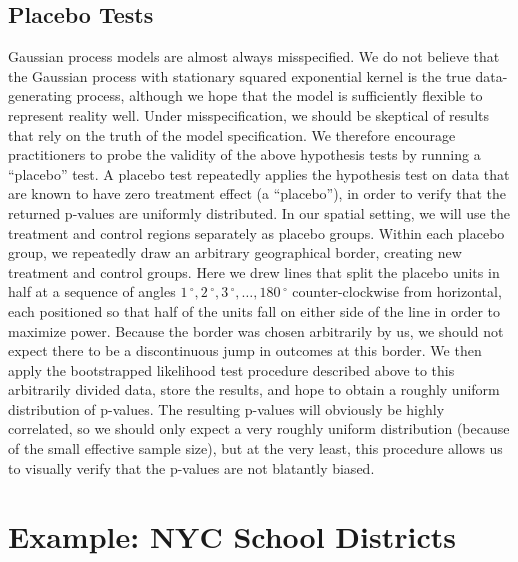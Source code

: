 \documentclass[letter]{article}
\newcommand{\degree}{{\,^\circ}}
\begin{document}
    	\subsection{Placebo Tests}\label{placebo-tests}
    

\label{sec:placebo}
    	Gaussian process models are almost always misspecified.
We do not believe that the Gaussian process with stationary squared exponential kernel is the true data-generating process, although we hope that the model is sufficiently flexible to represent reality well.
Under misspecification, we should be skeptical of results that rely on the truth of the model specification.
We therefore encourage practitioners to probe the validity of the above hypothesis tests by running a ``placebo'' test.
A placebo test repeatedly applies the hypothesis test on data that are known to have zero treatment effect (a ``placebo''),
in order to verify that the returned p-values are uniformly distributed.
In our spatial setting, we will use the treatment and control regions separately as placebo groups.
Within each placebo group, we repeatedly draw an arbitrary geographical border, creating new treatment and control groups.
Here we drew lines that split the placebo units in half at a sequence of angles \(1\degree,2\degree,3\degree,\dotsc,180\degree\) counter-clockwise from horizontal, each positioned so that half of the units fall on either side of the line in order to maximize power.
Because the border was chosen arbitrarily by us, we should not expect there to be a discontinuous jump in outcomes at this border.
We then apply the bootstrapped likelihood test procedure described above to this arbitrarily divided data, store the results, and hope to obtain a roughly uniform distribution of p-values.
The resulting p-values will obviously be highly correlated, so we should only expect a very roughly uniform distribution (because of the small effective sample size), but at the very least, this procedure allows us to visually verify that the p-values are not blatantly biased.
    


    	\section{Example: NYC School Districts}\label{example-nyc-school-districts}

\label{sec:NYC_example}
\end{document}
